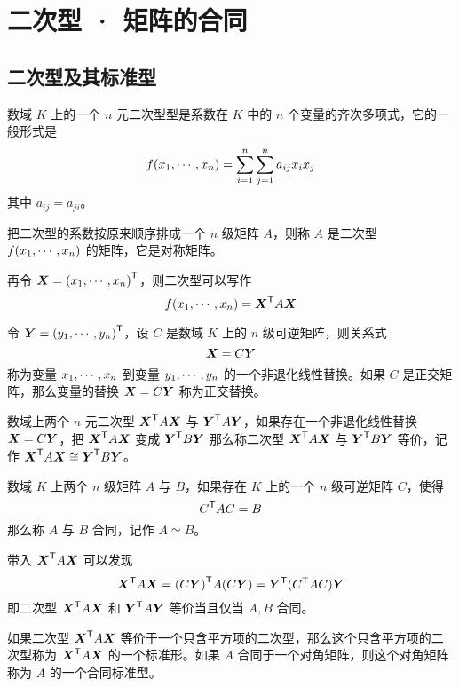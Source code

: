 \chapter{二次型 · 矩阵的合同}

\newcommand{\XAX}{\transpose{\vbf{X}}A\vbf{X}}

\section{二次型及其标准型}

\begin{definition}
	数域 $K$ 上的一个 $n$ 元二次型型是系数在 $K$ 中的 $n$ 个变量的齐次多项式，它的一般形式是
	\[f(x_1,\cdots,x_n) = \sum_{i=1}^n\sum_{j=1}^na_{ij}x_ix_j\]
	其中 $a_{ij} = a_{ji}$。
\end{definition}

把二次型的系数按原来顺序排成一个 $n$ 级矩阵 $A$，则称 $A$ 是二次型 $f(x_1,\cdots,x_n)$ 的矩阵，它是对称矩阵。

再令 $\boldsymbol{X} = {(x_1,\cdots,x_n)}^\mathsf{T}$，则二次型可以写作
\[f(\seq{x}{n}) = \XAX\]

令 $\boldsymbol{Y} = {(y_1,\cdots,y_n)}^\mathsf{T}$，设 $C$ 是数域 $K$ 上的 $n$ 级可逆矩阵，则关系式
\[\boldsymbol{X} = C\boldsymbol{Y}\]
称为变量 $x_1,\cdots,x_n$ 到变量 $y_1,\cdots,y_n$ 的一个非退化线性替换。如果 $C$ 是正交矩阵，那么变量的替换 $\boldsymbol{X} = C\boldsymbol{Y}$ 称为正交替换。

\begin{definition}
	数域上两个 $n$ 元二次型 $\XAX$ 与 ${\boldsymbol{Y}}^\mathsf{T}A\boldsymbol{Y}$，如果存在一个非退化线性替换 $\boldsymbol{X} = C\boldsymbol{Y}$，把 $\XAX$ 变成 ${\boldsymbol{Y}}^\mathsf{T}B\boldsymbol{Y}$ 那么称二次型 $\XAX$ 与 ${\boldsymbol{Y}}^\mathsf{T}B\boldsymbol{Y}$ 等价，记作 $\XAX \cong \transpose{\vbf{Y}}B\vbf{Y}$。
\end{definition}

\begin{definition}
	数域 $K$ 上两个 $n$ 级矩阵 $A$ 与 $B$，如果存在 $K$ 上的一个 $n$ 级可逆矩阵 $C$，使得
	\[{C}^\mathsf{T}AC = B\]
	那么称 $A$ 与 $B$ 合同，记作 $A\simeq B$。
\end{definition}

带入 $\XAX$ 可以发现
\[ \XAX = \transpose{(C\vbf{Y})} A (C\vbf{Y}) = \transpose{\vbf{Y}} (\transpose{C} A C) \vbf{Y} \]
即二次型 $\XAX$ 和 ${\boldsymbol{Y}}^\mathsf{T}A\boldsymbol{Y}$ 等价当且仅当 $A, B$ 合同。

如果二次型 ${\boldsymbol{X}}^\mathsf{T} A \boldsymbol{X}$ 等价于一个只含平方项的二次型，那么这个只含平方项的二次型称为 $\XAX$ 的一个标准形。如果 $A$ 合同于一个对角矩阵，则这个对角矩阵称为 $A$ 的一个合同标准型。

